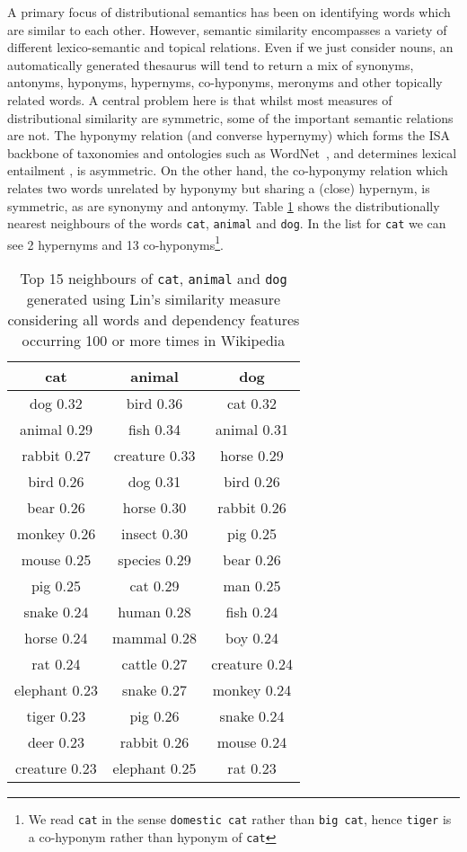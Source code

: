 \documentclass[11pt]{article}
\begin{document}
A primary focus of distributional semantics has been on identifying words which are similar to each other. However, semantic similarity encompasses a variety of different lexico-semantic and topical relations.  Even if we just consider nouns, an automatically generated thesaurus will tend to return a mix of synonyms, antonyms, hyponyms, hypernyms, co-hyponyms, meronyms and other topically related words.  A central problem here is that whilst most measures of distributional similarity are symmetric, some of the important semantic relations are not.  The hyponymy relation (and converse hypernymy) which forms the ISA backbone of taxonomies and ontologies such as WordNet~\cite{Fellbaum:98}, and determines lexical entailment \cite{Geffet2005}, is asymmetric. On the other hand, the co-hyponymy relation which relates two words unrelated by hyponymy but sharing a (close) hypernym, is symmetric, as are synonymy and antonymy. Table \ref{table:neighbours} shows the distributionally nearest neighbours of the words \texttt{cat}, \texttt{animal} and \texttt{dog}. %
In the list for \texttt{cat} we can see 2 hypernyms and 13 co-hyponyms\footnote{We read \texttt{cat} in the sense \texttt{domestic cat} rather than \texttt{big cat}, hence \texttt{tiger} is a co-hyponym rather than hyponym of \texttt{cat}}. 

\begin{table}[th]
\begin{tabular}{|c|c|c|}
\hline
cat&animal&dog\\
\hline
dog 0.32&bird 0.36&cat 0.32\\
animal 0.29&fish 0.34&animal 0.31\\
rabbit 0.27&creature 0.33&horse 0.29\\
bird 0.26&dog 0.31&bird 0.26\\
bear 0.26&horse 0.30&rabbit 0.26\\
monkey 0.26&insect 0.30&pig 0.25\\
mouse 0.25&species 0.29&bear 0.26\\
pig 0.25&cat 0.29&man 0.25\\
snake 0.24&human 0.28&fish 0.24\\
horse 0.24&mammal 0.28&boy 0.24\\
rat 0.24&cattle 0.27&creature 0.24\\
elephant 0.23&snake 0.27&monkey 0.24\\
tiger 0.23&pig 0.26&snake 0.24\\
deer 0.23&rabbit 0.26&mouse 0.24\\
creature 0.23&elephant 0.25&rat 0.23\\
\hline
\end{tabular}
\label{table:neighbours}
\caption{Top 15 neighbours of \texttt{cat}, \texttt{animal} and \texttt{dog} generated using Lin's similarity measure \cite{Lin1998} considering all words and dependency features occurring 100 or more times in Wikipedia}
\end{table}
\end{document}
